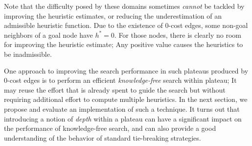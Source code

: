 Note that the difficulty posed by these domains sometimes \emph{cannot}
be tackled by improving the heuristic estimates, or reducing the
underestimation of an admissible heuristic function.  Due to the
existence of 0-cost edges, some non-goal neighbors of a goal node 
have $h^*=0$. For those nodes,
there is clearly no room for improving the heuristic estimate; Any positive
value causes the heuristics to be inadmissible.

One approach to improving the search performance in such plateaus
produced by 0-cost edges is to perform an efficient
\emph{knowledge-free} search within plateau; It may reuse the effort
that is already spent to guide the search but without requiring 
additional effort to compute multiple heuristics.
In the next section, we propose and evaluate an implementation of
such a technique. It turns out that introducing a notion of \emph{depth} within a plateau can have
a significant impact on the performance of knowledge-free search, and can also 
provide a good  understanding of the behavior of standard tie-breaking strategies.

